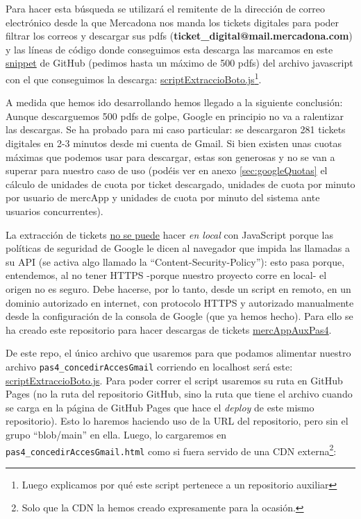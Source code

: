 \documentclass[a4paper,12pt]{report}
\begin{document}
	
	Para hacer esta búsqueda se utilizará el remitente de la dirección  de correo electrónico desde la que  Mercadona nos manda los tickets digitales para poder filtrar los correos y descargar sus  pdfs (\textbf{ticket\_digital@mail.mercadona.com}) y las líneas de código donde conseguimos esta descarga las marcamos en este  \href{https://github.com/blackcub3s/mercAppAuxPas4/blob/e899ea50757bf3367c523f5a21d59f79bdb381ad/js/scriptExtraccioBoto.js#L89-L93}{snippet} de GitHub (pedimos hasta un máximo de 500 pdfs) del archivo javascript con el que conseguimos la descarga: \href{https://github.com/blackcub3s/mercAppAuxPas4/blob/main/js/scriptExtraccioBoto.js}{scriptExtraccioBoto.js}\footnote{Luego explicamos por qué este script pertenece a un repositorio auxiliar}.
	
	A medida que hemos ido desarrollando hemos llegado a la siguiente conclusión: Aunque descarguemos 500  pdfs de golpe, Google en principio no va a ralentizar las descargas. Se ha probado para mi caso particular: se descargaron 281 tickets digitales en 2-3 minutos desde mi cuenta de Gmail. Si bien existen unas cuotas máximas que podemos usar para descargar, estas son generosas y no se van a superar para nuestro caso de uso (podéis ver en anexo \ref{sec:googleQuotas} el cálculo de unidades de cuota por ticket descargado, unidades de cuota por minuto por usuario de mercApp y unidades de cuota por minuto del sistema ante usuarios concurrentes). 
	
	
	La extracción de tickets \underline{no se puede} hacer \textit{en local} con JavaScript porque las políticas de seguridad de Google le dicen al navegador que impida las llamadas a su API (se activa algo llamado la ``Content-Security-Policy''): esto pasa porque, entendemos, al no tener HTTPS -porque nuestro proyecto corre en local- el origen no es seguro. Debe hacerse, por lo tanto, desde un script en remoto, en un dominio autorizado en internet, con protocolo HTTPS y autorizado manualmente desde la configuración de la consola de Google (que ya hemos hecho). Para ello se ha creado este repositorio para hacer descargas de tickets \href{https://github.com/blackcub3s/mercAppAuxPas4/}{mercAppAuxPas4}.
	
	De este repo, el único archivo que usaremos para que podamos alimentar nuestro archivo \texttt{pas4\_concedirAccesGmail} corriendo en localhost será este: \href{https://github.com/blackcub3s/mercAppAuxPas4/blob/main/js/scriptExtraccioBoto.js}{scriptExtraccioBoto.js}. Para poder correr el script usaremos su ruta en GitHub Pages (no la ruta del repositorio GitHub, sino la ruta que tiene el archivo cuando se carga en la página de GitHub Pages que hace el \textit{deploy} de este mismo repositorio). Esto lo haremos haciendo uso de la URL del repositorio, pero sin el grupo ``blob/main'' en ella. Luego, lo cargaremos en \texttt{pas4\_concedirAccesGmail.html} como si fuera servido de una CDN externa\footnote{Solo que la CDN la hemos creado expresamente para la ocasión.}:
	
\end{document}
